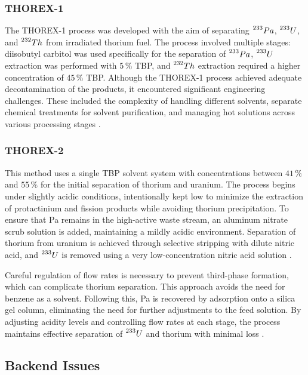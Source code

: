 \subsubsection{THOREX-1}

The THOREX-1 process was developed with the aim of separating \(\prescript{233}{}{Pa}\), \(\prescript{233}{}{U}\), and \(\prescript{232}{}{Th}\) from irradiated thorium fuel. The process involved multiple stages: diisobutyl carbitol was used specifically for the separation of \(\prescript{233}{}{Pa}\), \(\prescript{233}{}{U}\) extraction was performed with \(5 \, \%\) TBP, and \(\prescript{232}{}{Th}\) extraction required a higher concentration of \(45 \, \%\) TBP. Although the THOREX-1 process achieved adequate decontamination of the products, it encountered significant engineering challenges. These included the complexity of handling different solvents, separate chemical treatments for solvent purification, and managing hot solutions across various processing stages \cite{fuel_cycle_book}.


\subsubsection{THOREX-2}

 This method uses a single TBP solvent system with concentrations between \(41 \, \%\) and \(55 \, \%\) for the initial separation of thorium and uranium. The process begins under slightly acidic conditions, intentionally kept low to minimize the extraction of protactinium and fission products while avoiding thorium precipitation. To ensure that Pa remains in the high-active waste stream, an aluminum nitrate scrub solution is added, maintaining a mildly acidic environment. Separation of thorium from uranium is achieved through selective stripping with dilute nitric acid, and \(\prescript{233}{}{U}\) is removed using a very low-concentration nitric acid solution \cite{fuel_cycle_book}. 

Careful regulation of flow rates is necessary to prevent third-phase formation, which can complicate thorium separation. This approach avoids the need for benzene as a solvent. Following this, Pa is recovered by adsorption onto a silica gel column, eliminating the need for further adjustments to the feed solution. By adjusting acidity levels and controlling flow rates at each stage, the process maintains effective separation of \(\prescript{233}{}{U}\) and thorium with minimal loss \cite{fuel_cycle_book}.

\subsection{Backend Issues}

